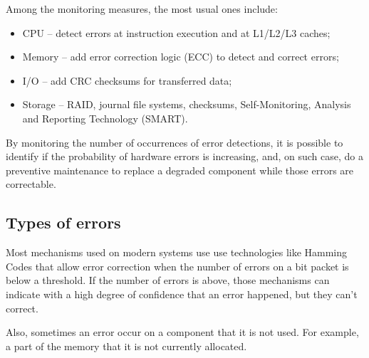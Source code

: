 \documentclass[a4paper,8pt,english]{sphinxmanual}
\begin{document}
Among the monitoring measures, the most usual ones include:
\begin{itemize}
\item {} 
CPU – detect errors at instruction execution and at L1/L2/L3 caches;

\item {} 
Memory – add error correction logic (ECC) to detect and correct errors;

\item {} 
I/O – add CRC checksums for transferred data;

\item {} 
Storage – RAID, journal file systems, checksums,
Self-Monitoring, Analysis and Reporting Technology (SMART).

\end{itemize}

By monitoring the number of occurrences of error detections, it is possible
to identify if the probability of hardware errors is increasing, and, on such
case, do a preventive maintenance to replace a degraded component while
those errors are correctable.


\subsection{Types of errors}
\label{admin-guide/ras:types-of-errors}
Most mechanisms used on modern systems use use technologies like Hamming
Codes that allow error correction when the number of errors on a bit packet
is below a threshold. If the number of errors is above, those mechanisms
can indicate with a high degree of confidence that an error happened, but
they can't correct.

Also, sometimes an error occur on a component that it is not used. For
example, a part of the memory that it is not currently allocated.
\end{document}
